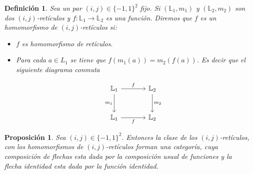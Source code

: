 \documentclass[12pt]{book}
\newtheorem{proposition}[theorem]{Proposición}
\newtheorem{definition}[theorem]{Definición}
\begin{document}
\begin{definition} Sea un par $(i,j) \in \{-1,1\}^{2}$ fijo. Si $(\mathbb{L}_{1},m_{1})$ y $(\mathbb{L}_{2},m_{2})$ son dos $(i,j)$-retículos y $f \colon \mathbb{L}_{1} \to \mathbb{L}_{2}$ es una función. Diremos que $f$ es un homomorfismo de $(i,j)$-retículos si:
\begin{itemize}
\item[1.] $f$ es homomorfismo de retículos.
\item[2.] Para cada $a \in L_{1}$ se tiene que $f(m_1(a)) = m_2(f(a))$. Es decir que el siguiente diagrama conmuta

\[
\begin{tikzcd}[row sep=large, column sep=large]
  \mathbb{L}_1 
    \arrow[r, "f" above] 
    \arrow[d, "m_1" left] 
  & \mathbb{L}_2 
    \arrow[d, "m_2" right] \\
  \mathbb{L}_1 
    \arrow[r, "f" below] 
  & \mathbb{L}_2
\end{tikzcd}
\]
\end{itemize}
\end{definition} 





\begin{proposition} \label{Categoría {$BDL(i,j)$}} Sea $(i,j) \in \{-1,1\}^{2}$. Entonces la clase de los $(i, j)$-retículos, con los homomorfismos de $(i,j)$-retículos forman una categoría, cuya composición de flechas esta dada por la composición usual de funciones y la flecha identidad esta dada por la función identidad. 
\end{proposition}
\end{document}
